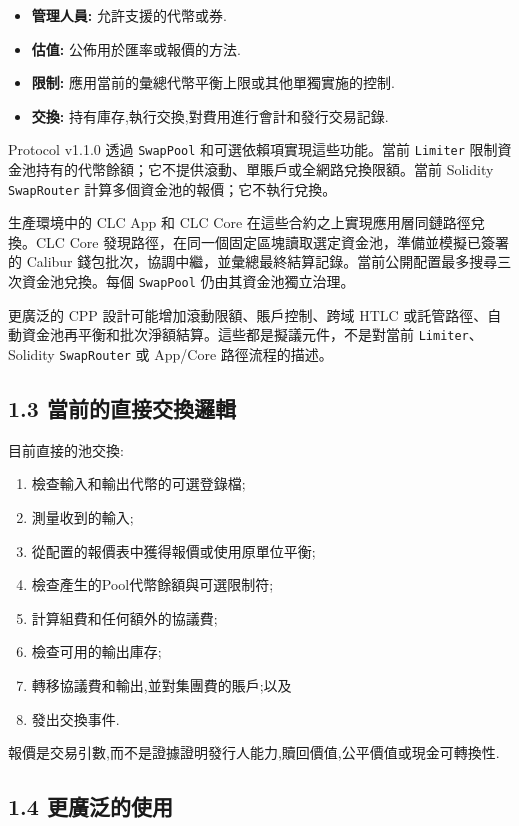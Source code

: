 \documentclass[11pt]{article}
\begin{document}
\begin{itemize}[leftmargin=*]
\item \textbf{管理人員:} 允許支援的代幣或券.
\item \textbf{估值:} 公佈用於匯率或報價的方法.
\item \textbf{限制:} 應用當前的彙總代幣平衡上限或其他單獨實施的控制.
\item \textbf{交換:} 持有庫存,執行交換,對費用進行會計和發行交易記錄.
\end{itemize}
Protocol v1.1.0 透過 \texttt{SwapPool} 和可選依賴項實現這些功能。當前 \texttt{Limiter} 限制資金池持有的代幣餘額；它不提供滾動、單賬戶或全網路兌換限額。當前 Solidity \texttt{SwapRouter} 計算多個資金池的報價；它不執行兌換。

生產環境中的 CLC App 和 CLC Core 在這些合約之上實現應用層同鏈路徑兌換。CLC Core 發現路徑，在同一個固定區塊讀取選定資金池，準備並模擬已簽署的 Calibur 錢包批次，協調中繼，並彙總最終結算記錄。當前公開配置最多搜尋三次資金池兌換。每個 \texttt{SwapPool} 仍由其資金池獨立治理。

更廣泛的 CPP 設計可能增加滾動限額、賬戶控制、跨域 HTLC 或託管路徑、自動資金池再平衡和批次淨額結算。這些都是擬議元件，不是對當前 \texttt{Limiter}、Solidity \texttt{SwapRouter} 或 App/Core 路徑流程的描述。

\subsection*{1.3 當前的直接交換邏輯}

目前直接的池交換:

\begin{enumerate}[leftmargin=*]
\item 檢查輸入和輸出代幣的可選登錄檔;
\item 測量收到的輸入;
\item 從配置的報價表中獲得報價或使用原單位平衡;
\item 檢查產生的Pool代幣餘額與可選限制符;
\item 計算組費和任何額外的協議費;
\item 檢查可用的輸出庫存;
\item 轉移協議費和輸出,並對集團費的賬戶;以及
\item 發出交換事件.
\end{enumerate}
報價是交易引數,而不是證據證明發行人能力,贖回價值,公平價值或現金可轉換性.

\subsection*{1.4 更廣泛的使用}
\end{document}
